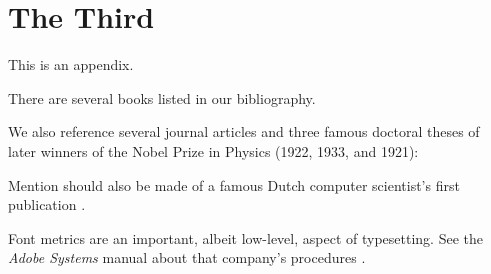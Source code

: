 
\chapter{The Third}

This is an appendix.

There are several books
\cite{%
    Farmelo:2009:SMH,%
    Knuth:1986:TB,%
    Knuth:1986:MB,%
    Knuth:1999:DT,%
    Lamport:1985:LDP,%
    Mittelbach:2004:LC,%
    Olver:2010:NHM,%
    Randell:1982:ODC,%
    Robbins:2005:CSS,%
    Salomon:1995:AT,%
    Singh:1997:FEE%
}
listed in our bibliography.

We also reference several journal articles
\cite{%
    Babbage:1910:BBA,%
    Beebe:2007:ETM,%
    Beebe:1989:PCP,%
    Cody:1981:APF,%
    Einstein:1906:NBM,%
    Einstein:1911:BMAa,%
    Einstein:1911:BMAb,%
    Goldstine:1946:ENI,%
    Hall:1994:PNE,%
    Heilbron:1969:GBA,%
    Huskey:1980:LLC,%
    Johnson:1978:LDT,%
    Kim:1999:AFC,%
    Lahiri:2002:ADA,%
    Taylor:1995:RTP,%
    Wiles:1995:MEC%
}
and three famous doctoral theses of later winners
\cite{%
    Bohr:1911:SME,%
    Dirac:1926:QM,%
    Einstein:1905:NBM%
}
of the Nobel Prize in Physics (1922, 1933, and
1921):



Mention should also be made of a famous Dutch
computer scientist's first publication
\cite{Dijkstra:1953:FBV}.

Font metrics are an important, albeit low-level,
aspect of typesetting. See the \emph{Adobe
Systems} manual about that company's procedures
\cite{Adobe:1990:AFM}.

